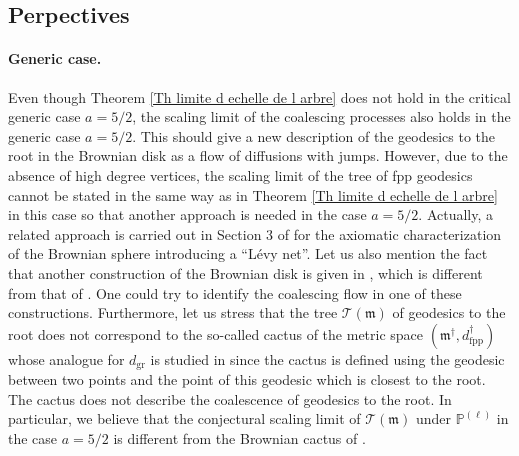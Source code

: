\documentclass[11pt]{article}
\numberwithin{equation}{section}
\def \T{\mathcal{T}}
\def\P{\mathbb{P}}
\begin{document}
\subsection{Perpectives}
\paragraph{Generic case.} {Even though Theorem \ref{Th limite d echelle de l arbre} does not hold in the critical generic case $a=5/2$,} the scaling limit of the coalescing processes also holds in the generic case $a=5/2$. This should give a new description of the geodesics to the root in the Brownian disk as a flow of diffusions with jumps. However, due to the absence of high degree vertices, the scaling limit of the tree of fpp geodesics cannot be stated in the same way as in Theorem \ref{Th limite d echelle de l arbre} in this case so that another approach is needed in the case $a=5/2$. Actually, a related approach is carried out in Section 3 of \cite{MS21} for the axiomatic characterization of the Brownian sphere introducing a ``Lévy net''. {Let us also mention the fact that another construction of the Brownian disk is given in \cite{LG19}, which is different from that of \cite{Bett15,BM17}. One could try to identify the coalescing flow in one of these constructions. Furthermore, let us stress that the tree $\T(\mathfrak{m})$ of geodesics to the root does not correspond to the so-called cactus of the metric space $(\mathfrak{m}^\dagger,d^\dagger_\mathrm{fpp})$ whose analogue for $d_\mathrm{gr}$ is studied in \cite{CLGM13} since the cactus is defined using the geodesic between two points and the point of this geodesic which is closest to the root. The cactus does not describe the coalescence of geodesics to the root. In particular, we believe that the conjectural scaling limit of $\T(\mathfrak{m})$ under $\P^{(\ell)}$ in the case $a=5/2$ is different from the Brownian cactus of \cite{CLGM13}.}
\end{document}
